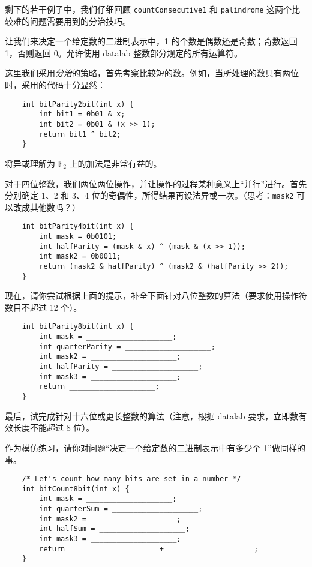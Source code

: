     剩下的若干例子中，我们仔细回顾 \texttt{countConsecutive1} 和 \texttt{palindrome} 这两个比较难的问题需要用到的分治技巧。
    \begin{example}[计数]
        让我们来决定一个给定数的二进制表示中，1 的个数是偶数还是奇数；奇数返回 1，否则返回 0。允许使用 datalab 整数部分规定的所有运算符。
        
        这里我们采用\emph{分治}的策略，首先考察比较短的数。例如，当所处理的数只有两位时，采用的代码十分显然：
        \begin{verbatim}
    int bitParity2bit(int x) {
        int bit1 = 0b01 & x;
        int bit2 = 0b01 & (x >> 1);
        return bit1 ^ bit2;
    }
        \end{verbatim}
        将异或理解为 $\mathbb F_2$ 上的加法是非常有益的。

        对于四位整数，我们两位两位操作，并让操作的过程某种意义上“并行”进行。首先分别确定 1、2 和 3、4 位的奇偶性，所得结果再设法异或一次。（思考：\texttt{mask2} 可以改成其他数吗？）
        \begin{verbatim}
    int bitParity4bit(int x) {
        int mask = 0b0101;
        int halfParity = (mask & x) ^ (mask & (x >> 1));
        int mask2 = 0b0011;
        return (mask2 & halfParity) ^ (mask2 & (halfParity >> 2));
    }
        \end{verbatim}

        现在，请你尝试根据上面的提示，补全下面针对八位整数的算法（要求使用操作符数目不超过 12 个）。
        \begin{verbatim}
    int bitParity8bit(int x) {
        int mask = ____________________;
        int quarterParity = ____________________;
        int mask2 = ____________________;
        int halfParity = ____________________;
        int mask3 = ____________________;
        return ____________________;
    }
        \end{verbatim}
        最后，试完成针对十六位或更长整数的算法（注意，根据 datalab 要求，立即数有效长度不能超过 8 位）。
        
        作为模仿练习，请你对问题“决定一个给定数的二进制表示中有多少个 1”做同样的事。
        \begin{verbatim}
    /* Let's count how many bits are set in a number */
    int bitCount8bit(int x) {
        int mask = ____________________;
        int quarterSum = ____________________;
        int mask2 = ____________________;
        int halfSum = ____________________;
        int mask3 = ____________________;
        return ____________________ + ____________________;
    }
        \end{verbatim}
    \end{example}

